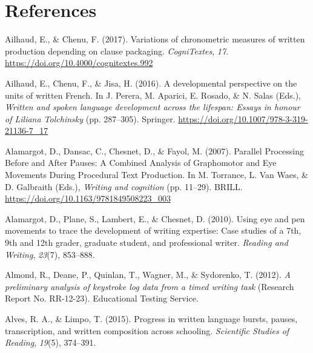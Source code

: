 \documentclass[
  man,floatsintext]{apa7}
\newlength{\cslhangindent}
\newlength{\cslentryspacingunit} %
\newenvironment{CSLReferences}[2] %
 {%
  \setlength{\parindent}{0pt}
  \ifodd #1
  \let\oldpar\par
  \def\par{\hangindent=\cslhangindent\oldpar}
  \fi
  \setlength{\parskip}{#2\cslentryspacingunit}
 }%
 {}
\begin{document}
\newpage

\hypertarget{references}{%
\section{References}\label{references}}

\begingroup

\hypertarget{refs}{}
\begin{CSLReferences}{1}{0}
\leavevmode{}%
Ailhaud, E., \& Chenu, F. (2017). Variations of chronometric measures of written production depending on clause packaging. \emph{CogniTextes}, \emph{17}. \url{https://doi.org/10.4000/cognitextes.992}

\leavevmode{}%
Ailhaud, E., Chenu, F., \& Jisa, H. (2016). A developmental perspective on the units of written {F}rench. In J. Perera, M. Aparici, E. Rosado, \& N. Salas (Eds.), \emph{Written and spoken language development across the lifespan: Essays in honour of {Liliana Tolchinsky}} (pp. 287--305). Springer. \url{https://doi.org/10.1007/978-3-319-21136-7_17}

\leavevmode{}%
Alamargot, D., Dansac, C., Chesnet, D., \& Fayol, M. (2007). {Parallel Processing Before and After Pauses: A Combined Analysis of Graphomotor and Eye Movements During Procedural Text Production}. In M. Torrance, L. Van Waes, \& D. Galbraith (Eds.), \emph{Writing and cognition} (pp. 11--29). BRILL. \url{https://doi.org/10.1163/9781849508223_003}

\leavevmode{}%
Alamargot, D., Plane, S., Lambert, E., \& Chesnet, D. (2010). Using eye and pen movements to trace the development of writing expertise: Case studies of a 7th, 9th and 12th grader, graduate student, and professional writer. \emph{Reading and Writing}, \emph{23}(7), 853--888.

\leavevmode{}%
Almond, R., Deane, P., Quinlan, T., Wagner, M., \& Sydorenko, T. (2012). \emph{A preliminary analysis of keystroke log data from a timed writing task} (Research Report No. RR-12-23). Educational Testing Service.

\leavevmode{}%
Alves, R. A., \& Limpo, T. (2015). Progress in written language bursts, pauses, transcription, and written composition across schooling. \emph{Scientific Studies of Reading}, \emph{19}(5), 374--391.


\end{CSLReferences}
\end{document}
